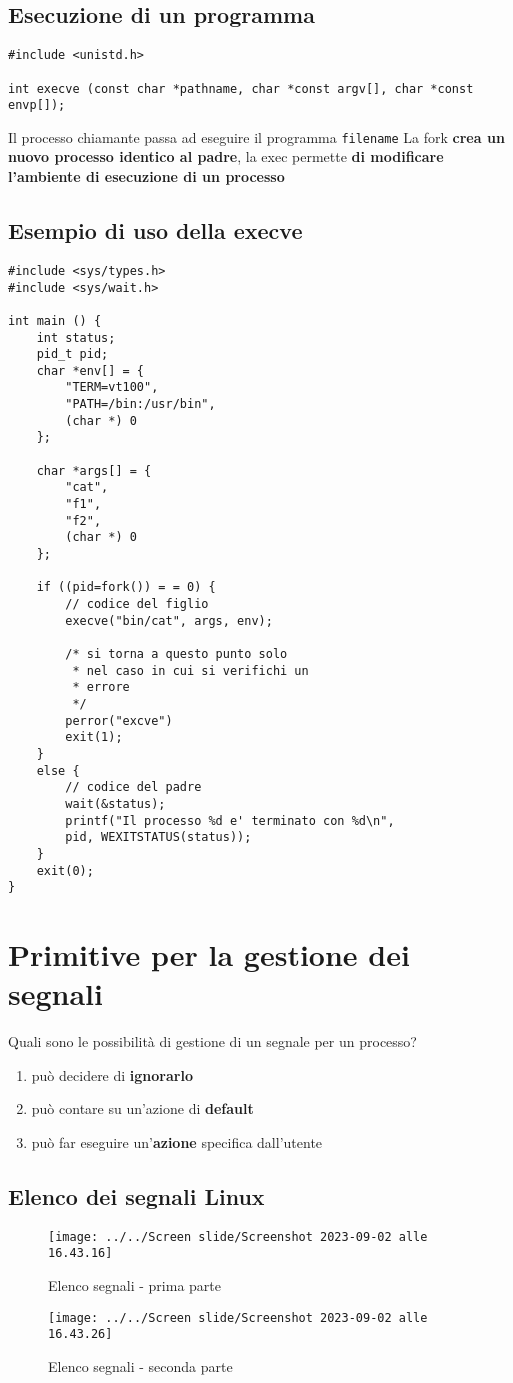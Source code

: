 \documentclass[italian,12pt,a4paper]{article}
\begin{document}
\subsection{Esecuzione di un programma}
\begin{verbatim}
#include <unistd.h>

int execve (const char *pathname, char *const argv[], char *const envp[]);
\end{verbatim}
Il processo chiamante passa ad eseguire il programma \verb|filename|
La fork \textbf{crea un nuovo processo identico al padre}, la exec permette \textbf{di modificare l'ambiente di esecuzione di un processo}
\subsection{Esempio di uso della execve}
\begin{lstlisting}
#include <sys/types.h>
#include <sys/wait.h>

int main () {
	int status;
	pid_t pid;
	char *env[] = {
		"TERM=vt100",
		"PATH=/bin:/usr/bin",
		(char *) 0
	};
	
	char *args[] = {
		"cat",
		"f1",
		"f2",
		(char *) 0
	}; 
	
	if ((pid=fork()) = = 0) {
		// codice del figlio
		execve("bin/cat", args, env);
		
		/* si torna a questo punto solo
		 * nel caso in cui si verifichi un
		 * errore
		 */
		perror("excve")
		exit(1);
	}
	else {
		// codice del padre
		wait(&status);
		printf("Il processo %d e' terminato con %d\n", 
		pid, WEXITSTATUS(status));
	}
	exit(0);
}
\end{lstlisting}
\section{Primitive per la gestione dei segnali}
Quali sono le possibilità di gestione di un segnale per un processo?
\begin{enumerate}
	\item può decidere di \textbf{ignorarlo}
	\item può contare su un'azione di \textbf{default}
	\item può far eseguire un'\textbf{azione} specifica dall'utente
\end{enumerate}
\newpage
\subsection{Elenco dei segnali Linux}
\begin{figure}[h!]
	\centering
	\texttt{[image: ../../Screen slide/Screenshot 2023-09-02 alle 16.43.16]}
	\caption{Elenco segnali - prima parte}
\end{figure}
\begin{figure}[h!]
	\centering
	\texttt{[image: ../../Screen slide/Screenshot 2023-09-02 alle 16.43.26]}
	\caption{Elenco segnali - seconda parte}
\end{figure}
\end{document}
